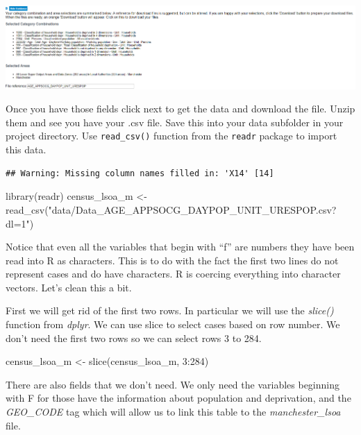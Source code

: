\documentclass[
]{book}
\newenvironment{Shaded}{\begin{snugshade}}{\end{snugshade}}
\newcommand{\DecValTok}[1]{\textcolor[rgb]{0.00,0.00,0.81}{#1}}
\newcommand{\FunctionTok}[1]{\textcolor[rgb]{0.00,0.00,0.00}{#1}}
\newcommand{\NormalTok}[1]{#1}
\newcommand{\OtherTok}[1]{\textcolor[rgb]{0.56,0.35,0.01}{#1}}
\newcommand{\SpecialCharTok}[1]{\textcolor[rgb]{0.00,0.00,0.00}{#1}}
\newcommand{\StringTok}[1]{\textcolor[rgb]{0.31,0.60,0.02}{#1}}
\begin{document}
\includegraphics{img/infuseselection.png}

Once you have those fields click next to get the data and download the file. Unzip them and see you have your .csv file. Save this into your data subfolder in your project directory. Use \texttt{read\_csv()} function from the \texttt{readr} package to import this data.

\begin{verbatim}
## Warning: Missing column names filled in: 'X14' [14]
\end{verbatim}

\begin{Shaded}
\begin{Highlighting}[]
\FunctionTok{library}\NormalTok{(readr)}
\NormalTok{census\_lsoa\_m }\OtherTok{\textless{}{-}} \FunctionTok{read\_csv}\NormalTok{(}\StringTok{"data/Data\_AGE\_APPSOCG\_DAYPOP\_UNIT\_URESPOP.csv?dl=1"}\NormalTok{)}
\end{Highlighting}
\end{Shaded}

Notice that even all the variables that begin with ``f'' are numbers they have been read into R as characters. This is to do with the fact the first two lines do not represent cases and do have characters. R is coercing everything into character vectors. Let's clean this a bit.

First we will get rid of the first two rows. In particular we will use the \emph{slice()} function from \emph{dplyr}. We can use slice to select cases based on row number. We don't need the first two rows so we can select rows 3 to 284.

\begin{Shaded}
\begin{Highlighting}[]
\NormalTok{census\_lsoa\_m }\OtherTok{\textless{}{-}} \FunctionTok{slice}\NormalTok{(census\_lsoa\_m, }\DecValTok{3}\SpecialCharTok{:}\DecValTok{284}\NormalTok{)}
\end{Highlighting}
\end{Shaded}

There are also fields that we don't need. We only need the variables beginning with F for those have the information about population and deprivation, and the \emph{GEO\_CODE} tag which will allow us to link this table to the \emph{manchester\_lsoa} file.
\end{document}
